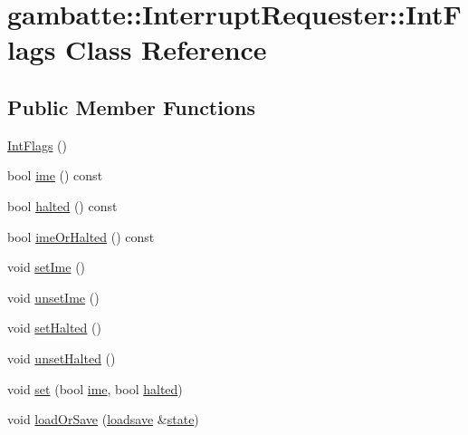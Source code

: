 \hypertarget{classgambatte_1_1InterruptRequester_1_1IntFlags}{}\section{gambatte\+:\+:Interrupt\+Requester\+:\+:Int\+Flags Class Reference}
\label{classgambatte_1_1InterruptRequester_1_1IntFlags}
\subsection*{Public Member Functions}
\begin{DoxyCompactItemize}
\item 
\hyperlink{classgambatte_1_1InterruptRequester_1_1IntFlags_ade4bb1590cd0d09681771bfd5c14162c}{Int\+Flags} ()
\item 
bool \hyperlink{classgambatte_1_1InterruptRequester_1_1IntFlags_a1d2013209732079b1808306088d931ff}{ime} () const
\item 
bool \hyperlink{classgambatte_1_1InterruptRequester_1_1IntFlags_a8206d665f9772d64144d6be5d8c1a5cb}{halted} () const
\item 
bool \hyperlink{classgambatte_1_1InterruptRequester_1_1IntFlags_a8fa10e667caf8ee75e4160831b408e5f}{ime\+Or\+Halted} () const
\item 
void \hyperlink{classgambatte_1_1InterruptRequester_1_1IntFlags_a7ba10cdfb4510071d25d34f156f0d340}{set\+Ime} ()
\item 
void \hyperlink{classgambatte_1_1InterruptRequester_1_1IntFlags_a200fcbd2f4aafc8d1270f127f6b73605}{unset\+Ime} ()
\item 
void \hyperlink{classgambatte_1_1InterruptRequester_1_1IntFlags_a1165e408af70f4c57bad2624aca64c91}{set\+Halted} ()
\item 
void \hyperlink{classgambatte_1_1InterruptRequester_1_1IntFlags_ab8a9985dc5e4319aae2604e82948f2ed}{unset\+Halted} ()
\item 
void \hyperlink{classgambatte_1_1InterruptRequester_1_1IntFlags_a39bae600579578159fd4479a7db8bffd}{set} (bool \hyperlink{classgambatte_1_1InterruptRequester_1_1IntFlags_a1d2013209732079b1808306088d931ff}{ime}, bool \hyperlink{classgambatte_1_1InterruptRequester_1_1IntFlags_a8206d665f9772d64144d6be5d8c1a5cb}{halted})
\item 
void \hyperlink{classgambatte_1_1InterruptRequester_1_1IntFlags_a67e0b21fe08af2364e644b6240fe28d3}{load\+Or\+Save} (\hyperlink{classgambatte_1_1loadsave}{loadsave} \&\hyperlink{ppu_8cpp_a2f2eca6997ee7baf8901725ae074d45b}{state})
\end{DoxyCompactItemize}
